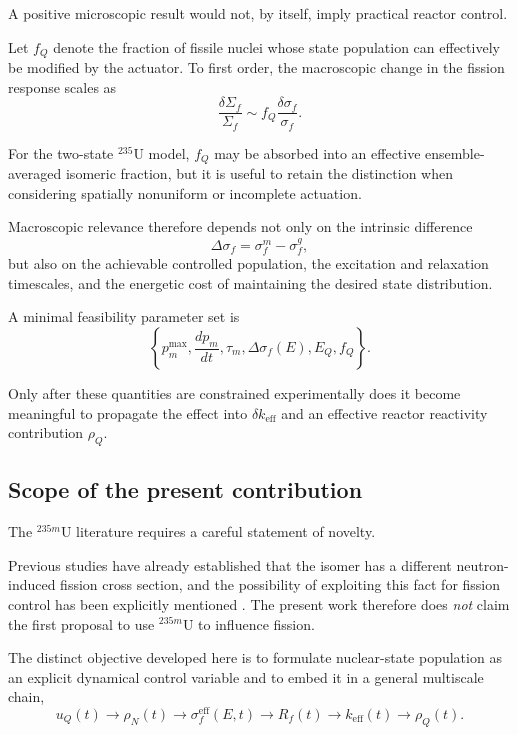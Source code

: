 A positive microscopic result would not, by itself, imply practical reactor control.

Let $f_Q$ denote the fraction of fissile nuclei whose state population can effectively be modified by the actuator. To first order, the macroscopic change in the fission response scales as
\begin{equation}
\frac{\delta\Sigma_f}{\Sigma_f}
\sim
f_Q\frac{\delta\sigma_f}{\sigma_f}.
\end{equation}

For the two-state $^{235}\mathrm{U}$ model, $f_Q$ may be absorbed into an effective ensemble-averaged isomeric fraction, but it is useful to retain the distinction when considering spatially nonuniform or incomplete actuation.

Macroscopic relevance therefore depends not only on the intrinsic difference
\begin{equation}
\Delta\sigma_f=\sigma_f^m-\sigma_f^g,
\end{equation}
but also on the achievable controlled population, the excitation and relaxation timescales, and the energetic cost of maintaining the desired state distribution.

A minimal feasibility parameter set is
\begin{equation}
\boxed{
\left\{
p_m^{\max},
\frac{dp_m}{dt},
\tau_m,
\Delta\sigma_f(E),
E_Q,
f_Q
\right\}.
}
\end{equation}

Only after these quantities are constrained experimentally does it become meaningful to propagate the effect into $\delta k_{\mathrm{eff}}$ and an effective reactor reactivity contribution $\rho_Q$.

\subsection{Scope of the present contribution}

The $^{235m}\mathrm{U}$ literature requires a careful statement of novelty.

Previous studies have already established that the isomer has a different neutron-induced fission cross section, and the possibility of exploiting this fact for fission control has been explicitly mentioned \cite{deer1988,liu2022}. The present work therefore does \emph{not} claim the first proposal to use $^{235m}\mathrm{U}$ to influence fission.

The distinct objective developed here is to formulate nuclear-state population as an explicit dynamical control variable and to embed it in a general multiscale chain,
\begin{equation}
u_Q(t)
\rightarrow
\rho_N(t)
\rightarrow
\sigma_f^{\mathrm{eff}}(E,t)
\rightarrow
R_f(t)
\rightarrow
k_{\mathrm{eff}}(t)
\rightarrow
\rho_Q(t).
\end{equation}

